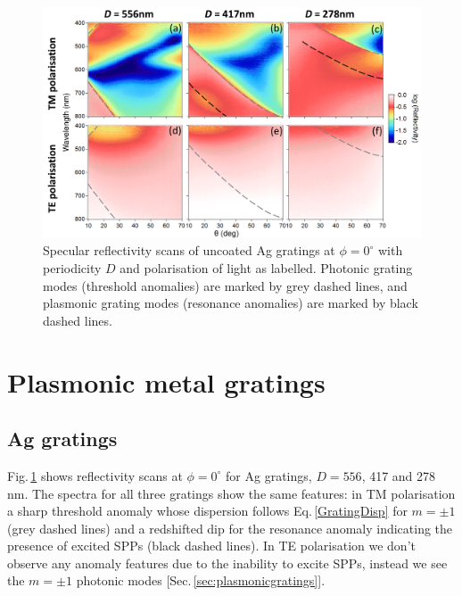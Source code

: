 \begin{figure}[h!] 
\centering    
\includegraphics[width=\textwidth]{Fig7}
\caption[TM and TE specular reflectivity scans of uncoated Ag gratings at $\phi=0^{\circ}$, $D=556$, 417 and 278\,nm.]{Specular reflectivity scans of uncoated Ag gratings at $\phi=0^{\circ}$ with periodicity $D$ and polarisation of light as labelled. Photonic grating modes (threshold anomalies) are marked by grey dashed lines, and plasmonic grating modes (resonance anomalies) are marked by black dashed lines.}
\label{7Fig7}
\end{figure}
\section{Plasmonic metal gratings}

\subsection{Ag gratings}
Fig.\,\ref{7Fig7} shows reflectivity scans at $\phi=0^{\circ}$ for Ag gratings, $D=556$, 417 and 278\,nm. The spectra for all three gratings show the same features: in TM polarisation a sharp threshold anomaly whose dispersion follows Eq.\,\ref{GratingDisp} for $m=\pm1$ (grey dashed lines) and a redshifted dip for the resonance anomaly indicating the presence of excited SPPs (black dashed lines). In TE polarisation we don't observe any anomaly features due to the inability to excite SPPs, instead we see the $m=\pm1$ photonic modes [Sec.\,\ref{sec:plasmonicgratings}].


